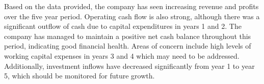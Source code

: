 

Based on the data provided, the company has seen increasing revenue and profits over the five year period. Operating cash flow is also strong, although there was a significant outflow of cash due to capital expenditures in years 1 and 2. The company has managed to maintain a positive net cash balance throughout this period, indicating good financial health. Areas of concern include high levels of working capital expenses in years 3 and 4 which may need to be addressed. Additionally, investment inflows have decreased significantly from year 1 to year 5, which should be monitored for future growth.